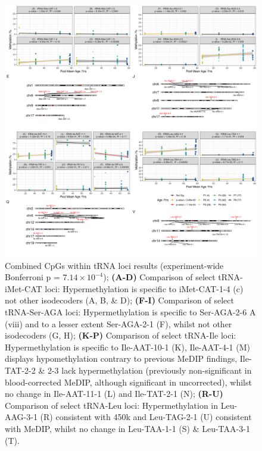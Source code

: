 \documentclass[
]{book}
\begin{document}
\begin{figure}

{\centering \includegraphics[width=1\linewidth]{./figs/combinedKaryoplots_sig_bl} 

}

\caption{Combined CpGs within tRNA loci results (experiment-wide Bonferroni p = \(7.14 \times 10^{-4}\)); \textbf{(A-D)} Comparison of select tRNA-iMet-CAT loci: Hypermethylation is specific to iMet-CAT-1-4 (c) not other isodecoders (A, B, \& D); \textbf{(F-I)} Comparison of select tRNA-Ser-AGA loci: Hypermethylation is specific to Ser-AGA-2-6 A (viii) and to a lesser extent Ser-AGA-2-1 (F), whilst not other isodecoders (G, H); \textbf{(K-P)} Comparison of select tRNA-Ile loci: Hypermethylation is specific to Ile-AAT-10-1 (K), Ile-AAT-4-1 (M) displays hypomethylation contrary to previous MeDIP findings, Ile-TAT-2-2 \& 2-3 lack hypermethylation (previously non-significant in blood-corrected MeDIP, although significant in uncorrected), whilst no change in Ile-AAT-11-1 (L) and Ile-TAT-2-1 (N); \textbf{(R-U)} Comparison of select tRNA-Leu loci: Hypermethylation in Leu-AAG-3-1 (R) consistent with 450k and Leu-TAG-2-1 (U) consistent with MeDIP, whilst no change in Leu-TAA-1-1 (S) \& Leu-TAA-3-1 (T).}\label{fig:combinedKaryoplots}
\end{figure}
\end{document}
